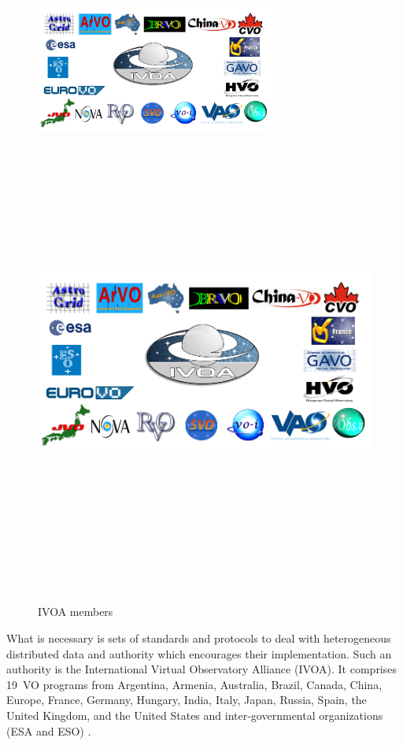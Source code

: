    \begin{figure}
     \vspace{0pt}
     \begin{center}
       \ifpdf
       \includegraphics[width=0.7\textwidth]{ivoamembers}
       \else
       \includegraphics[bb = 92 86 545 742, height=6in]{ivoamembers.jpg}
       \fi
     \end{center}
     \vspace{-20pt}
     \caption{IVOA members}
     \vspace{-10pt}
   \end{figure}


   What is necessary is sets of standards and protocols to deal with
   heterogeneous distributed data and authority which encourages their
   implementation. Such an authority is the International Virtual
   Observatory Alliance (IVOA). It comprises 19~VO programs from
   Argentina, Armenia, Australia, Brazil, Canada, China, Europe,
   France, Germany, Hungary, India, Italy, Japan, Russia, Spain, the
   United Kingdom, and the United States and inter-governmental
   organizations (ESA and ESO) \citep{hanisch2010international}.
   
